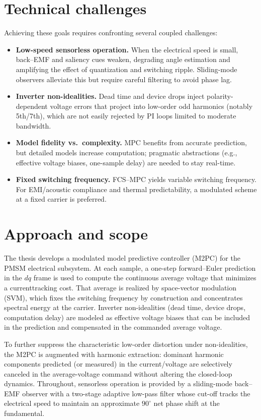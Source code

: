 \section{Technical challenges}
Achieving these goals requires confronting several coupled challenges:
\begin{itemize}
  \item \textbf{Low-speed sensorless operation.} When the electrical speed is small, back–EMF and saliency cues weaken, degrading angle estimation and amplifying the effect of quantization and switching ripple. Sliding-mode observers alleviate this but require careful filtering to avoid phase lag.
  \item \textbf{Inverter non-idealities.} Dead time and device drops inject polarity-dependent voltage errors that project into low-order odd harmonics (notably 5th/7th), which are not easily rejected by PI loops limited to moderate bandwidth.
  \item \textbf{Model fidelity vs.\ complexity.} MPC benefits from accurate prediction, but detailed models increase computation; pragmatic abstractions (e.g., effective voltage biases, one-sample delay) are needed to stay real-time.
  \item \textbf{Fixed switching frequency.} FCS–MPC yields variable switching frequency. For EMI/acoustic compliance and thermal predictability, a modulated scheme at a fixed carrier is preferred.
\end{itemize}

\section{Approach and scope}
The thesis develops a modulated model predictive controller (M2PC) for the PMSM electrical subsystem. At each sample, a one-step forward–Euler prediction in the $dq$ frame is used to compute the continuous average voltage that minimizes a current\-tracking cost. That average is realized by space-vector modulation (SVM), which fixes the switching frequency by construction and concentrates spectral energy at the carrier. Inverter non-idealities (dead time, device drops, computation delay) are modeled as effective voltage biases that can be included in the prediction and compensated in the commanded average voltage.

To further suppress the characteristic low-order distortion under non-idealities, the M2PC is augmented with harmonic extraction: dominant harmonic components predicted (or measured) in the current/voltage are selectively canceled in the average-voltage command without altering the closed-loop dynamics. Throughout, sensorless operation is provided by a sliding-mode back–EMF observer with a two-stage adaptive low-pass filter whose cut-off tracks the electrical speed to maintain an approximate $90^\circ$ net phase shift at the fundamental.


